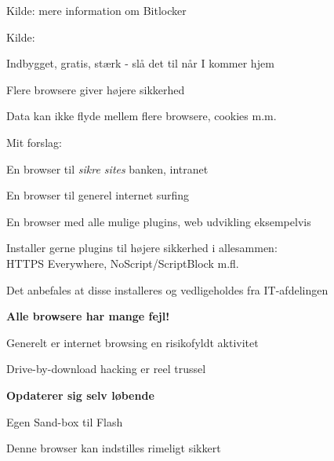 \documentclass[20pt,landscape,a4paper]{foils}
\begin{document}
Kilde: mere information om Bitlocker\\
{\footnotesize {}}



Kilde: {\small
{}}



\centerline{Indbygget, gratis, stærk - slå det til når I kommer hjem}





\begin{list1}
\item Flere browsere giver højere sikkerhed
\item Data kan ikke flyde mellem flere browsere, cookies m.m.
\item Mit forslag:
\begin{list2}
\item En browser til \emph{sikre sites} banken, intranet
\item En browser til generel internet surfing
\item En browser med alle mulige plugins, web udvikling eksempelvis
\end{list2}
\item Installer gerne plugins til højere sikkerhed i allesammen:\\
HTTPS Everywhere, NoScript/ScriptBlock m.fl.

\end{list1}

\vskip 1cm
\centerline{Det anbefales at disse installeres og vedligeholdes fra IT-afdelingen}


\vskip 1cm
\centerline{\bf\Large Alle browsere har mange fejl!}




\begin{list1}
\item Generelt er internet browsing en risikofyldt aktivitet
\item Drive-by-download hacking er reel trussel
\item {\bf Opdaterer sig selv løbende}
\item Egen Sand-box til Flash
\item Denne browser kan indstilles rimeligt sikkert
\end{list1}
\end{document}
